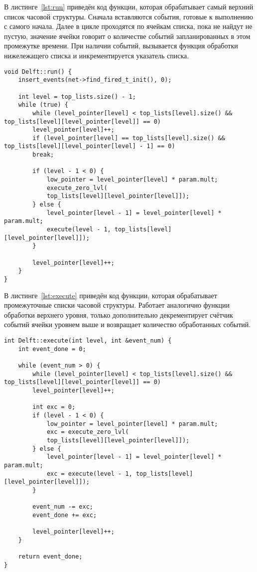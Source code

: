 В листинге~\ref{lst:run} приведён код функции, которая обрабатывает самый верхний список часовой структуры. Сначала вставляются события, готовые к выполнению с самого начала. Далее в цикле проходятся по ячейкам списка, пока не найдут не пустую, значение ячейки говорит о количестве событий запланированных в этом промежутке времени. При наличии событий, вызывается функция обработки нижележащего списка и инкрементируется указатель списка.

\begin{center}
	\captionsetup{justification=raggedright,singlelinecheck=off}
	\begin{lstlisting}[label=lst:run,caption=Функция обработки верхнего списка,showstringspaces=false]
void Delft::run() {
	insert_events(net->find_fired_t_init(), 0);
	
	int level = top_lists.size() - 1;
	while (true) {
		while (level_pointer[level] < top_lists[level].size() && top_lists[level][level_pointer[level]] == 0)
		level_pointer[level]++;
		if (level_pointer[level] == top_lists[level].size() && top_lists[level][level_pointer[level] - 1] == 0)
		break;
		
		if (level - 1 < 0) {
			low_pointer = level_pointer[level] * param.mult;
			execute_zero_lvl(
			top_lists[level][level_pointer[level]]);
		} else {
			level_pointer[level - 1] = level_pointer[level] * param.mult;
			execute(level - 1, top_lists[level][level_pointer[level]]);
		}
		
		level_pointer[level]++;
	}
}	
	\end{lstlisting}
\end{center}
\FloatBarrier

В листинге~\ref{lst:execute} приведён код функции, которая обрабатывает промежуточные списки часовой структуры. Работает аналогично функции обработки верхнего уровня, только дополнительно декрементирует счётчик событий ячейки уровнем выше и возвращает количество обработанных событий.

\begin{center}
	\captionsetup{justification=raggedright,singlelinecheck=off}
	\begin{lstlisting}[label=lst:execute,caption=Функция обработки промежуточных списков,showstringspaces=false]
int Delft::execute(int level, int &event_num) {
	int event_done = 0;
	
	while (event_num > 0) {
		while (level_pointer[level] < top_lists[level].size() && top_lists[level][level_pointer[level]] == 0)
		level_pointer[level]++;
		
		int exc = 0;
		if (level - 1 < 0) {
			low_pointer = level_pointer[level] * param.mult;
			exc = execute_zero_lvl(
			top_lists[level][level_pointer[level]]);
		} else {
			level_pointer[level - 1] = level_pointer[level] * param.mult;
			exc = execute(level - 1, top_lists[level][level_pointer[level]]);
		}
		
		event_num -= exc;
		event_done += exc;
		
		level_pointer[level]++;
	}
	
	return event_done;
}		
	\end{lstlisting}
\end{center}
\FloatBarrier

